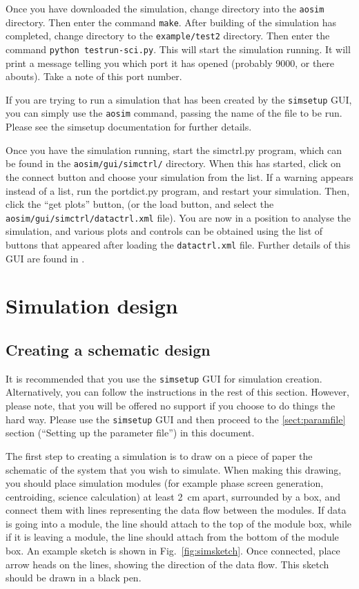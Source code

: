 \documentclass{article}
\begin{document}
Once you have downloaded the simulation, change directory into the
\texttt{aosim} directory.  Then enter the command \texttt{make}.
After building of the simulation has completed, change directory to
the \texttt{example/test2} directory.  Then enter the command
\texttt{python testrun-sci.py}.  This will start the simulation
running.  It will print a message telling you which port it has opened
(probably 9000, or there abouts).  Take a note of this port number.

If you are trying to run a simulation that has been created by the
\texttt{simsetup} GUI, you can simply use the \texttt{aosim} command,
passing the name of the file to be run.  Please see the simsetup
documentation for further details.

Once you have the simulation running, start the simctrl.py program,
which can be found in the \texttt{aosim/gui/simctrl/} directory.  When
this has started, click on the connect button and choose your
simulation from the list.  If a warning appears instead of a list, run
the portdict.py program, and restart your simulation.  Then, click the
``get plots'' button, (or the load button, and select the \texttt{aosim/gui/simctrl/datactrl.xml}
file).  You are now in a position to analyse the simulation, and
various plots and controls can be obtained using the list of buttons
that appeared after loading the \texttt{datactrl.xml} file.  Further
details of this GUI are found in \citet{simctrlgui}.

\section{Simulation design}
\subsection{Creating a schematic design}
It is recommended that you use the \texttt{simsetup} GUI for
simulation creation.  Alternatively, you can follow the instructions
in the rest of this section.  However, please note, that you will be
offered no support if you choose to do things the hard way.  Please
use the \texttt{simsetup} GUI and then proceed to the
\ref{sect:paramfile} section (``Setting up the parameter file'') in
this document.

The first step to creating a simulation is to draw on a piece of paper
the schematic of the system that you wish to simulate.  When making
this drawing, you should place simulation modules (for example phase
screen generation, centroiding, science calculation) at least 2~cm
apart, surrounded by a box, and connect them with lines representing
the data flow between the modules.  If data is going into a module,
the line should attach to the top of the module box, while if it is
leaving a module, the line should attach from the bottom of the module
box.  An example sketch is shown in Fig.~\ref{fig:simsketch}.  Once
connected, place arrow heads on the lines, showing the direction of
the data flow.  This sketch should be drawn in a black pen.
\end{document}
